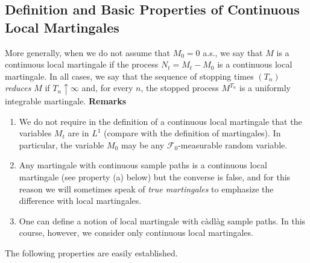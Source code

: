 \documentclass[../Main.tex]{subfiles}
\begin{document}
\subsection{Definition and Basic Properties of Continuous Local Martingales}
More generally, when we do not assume that $M_0 = 0$ a.s., we say that $M$ is a continuous local martingale if the process $N_t = M_t - M_0$ is a continuous local martingale. In all cases, we say that the sequence of stopping times $(T_n)$ \textit{reduces} $M$ if $T_n \uparrow \infty$ and, for every $n$, the stopped process $M^{T_n}$ is a uniformly integrable martingale.
\textbf{Remarks}
\begin{enumerate}
    \item We do not require in the definition of a continuous local martingale that the variables $M_t$ are in $L^1$ (compare with the definition of martingales). In particular, the variable $M_0$ may be any $\mathcal{F}_0$-measurable random variable.
    \item Any martingale with continuous sample paths is a continuous local martingale (see property (a) below) but the converse is false, and for this reason we will sometimes speak of \textit{true martingales} to emphasize the difference with local martingales.
    \item One can define a notion of local martingale with càdlàg sample paths. In this course, however, we consider only continuous local martingales.
\end{enumerate}
The following properties are easily established.
\end{document}
